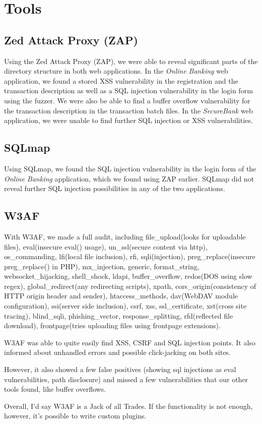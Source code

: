 \chapter{Tools}\label{chapter:tools}

\section{Zed Attack Proxy (ZAP)}
Using the Zed Attack Proxy (ZAP), we were able to reveal significant parts of the directory structure in both web applications. In the \textit{Online Banking} web application, we found a stored XSS vulnerability in the registration and the transaction description as well as a SQL injection vulnerability in the login form using the fuzzer. We were also be able to find a buffer overflow vulnerability for the transaction description in the transaction batch files. In the \textit{SecureBank} web application, we were unable to find further SQL injection or XSS vulnerabilities.

\section{SQLmap}
Using SQLmap, we found the SQL injection vulnerability in the login form of the \textit{Online Banking} application, which we found using ZAP earlier. SQLmap did not reveal further SQL injection possibilities in any of the two applications.

\section{W3AF}
With W3AF, we made a full audit, including file\_upload(looks for uploadable files), eval(insecure eval() usage), un\_ssl(secure content via http), os\_commanding, lfi(local file inclusion), rfi, sqli(injection), preg\_replace(insecure preg\_replace() in PHP), mx\_injection, generic, format\_string, websocket\_hijacking, shell\_shock, ldapi, buffer\_overflow, redos(DOS using slow regex), global\_redirect(any redirecting scripts), xpath, cors\_origin(consistency of HTTP origin header and sender), htaccess\_methods, dav(WebDAV module configuration), ssi(server side inclusion), csrf, xss, ssl\_certificate, xst(cross site tracing), blind\_sqli, phishing\_vector, response\_splitting, rfd(reflected file download), frontpage(tries uploading files using frontpage extensions).

W3AF was able to quite easily find XSS, CSRF and SQL injection points. It also informed about unhandled errors and possible click-jacking on both sites.

However, it also showed a few false positives (showing sql injections as eval vulnerabilities, path disclosure) and missed a few vulnerabilities that our other tools found, like buffer overflows.

Overall, I'd say W3AF is a Jack of all Trades. If the functionality is not enough, however, it's possible to write custom plugins.